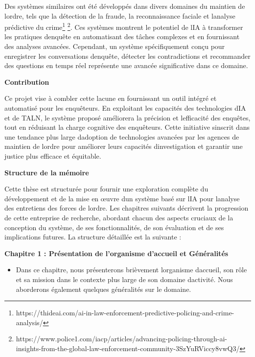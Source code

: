 \documentclass[
]{article}
\begin{document}
Des systèmes similaires ont été développés dans divers domaines du
maintien de l\textquotesingle ordre, tels que la détection de la fraude,
la reconnaissance faciale et l\textquotesingle analyse prédictive du
crime\footnote{https://thideai.com/ai-in-law-enforcement-predictive-policing-and-crime-analysis/}
\footnote{https://www.police1.com/iacp/articles/advancing-policing-through-ai-insights-from-the-global-law-enforcement-community-3SzYuRViccy8vwQ3/}.
Ces systèmes montrent le potentiel de l\textquotesingle IA à transformer
les pratiques d\textquotesingle enquête en automatisant des tâches
complexes et en fournissant des analyses avancées. Cependant, un système
spécifiquement conçu pour enregistrer les conversations
d\textquotesingle enquête, détecter les contradictions et recommander
des questions en temps réel représente une avancée significative dans ce
domaine.

\textbf{Contribution}

Ce projet vise à combler cette lacune en fournissant un outil intégré et
automatisé pour les enquêteurs. En exploitant les capacités des
technologies d\textquotesingle IA et de TALN, le système proposé
améliorera la précision et l\textquotesingle efficacité des enquêtes,
tout en réduisant la charge cognitive des enquêteurs. Cette initiative
s\textquotesingle inscrit dans une tendance plus large
d\textquotesingle adoption de technologies avancées par les agences de
maintien de l\textquotesingle ordre pour améliorer leurs capacités
d\textquotesingle investigation et garantir une justice plus efficace et
équitable.

\textbf{Structure de la mémoire}

Cette thèse est structurée pour fournir une exploration complète du
développement et de la mise en œuvre d\textquotesingle un système basé
sur l\textquotesingle IA pour l\textquotesingle analyse des entretiens
des forces de l\textquotesingle ordre. Les chapitres suivants décrivent
la progression de cette entreprise de recherche, abordant chacun des
aspects cruciaux de la conception du système, de ses fonctionnalités, de
son évaluation et de ses implications futures. La structure détaillée
est la suivante :

\textbf{Chapitre 1 : Présentation de l'organisme d'accueil et
Généralités}

\begin{itemize}
\item
  Dans ce chapitre, nous présenterons brièvement
  l\textquotesingle organisme d\textquotesingle accueil, son rôle et sa
  mission dans le contexte plus large de son domaine
  d\textquotesingle activité. Nous aborderons également quelques
  généralités sur le domaine.
\end{itemize}
\end{document}
